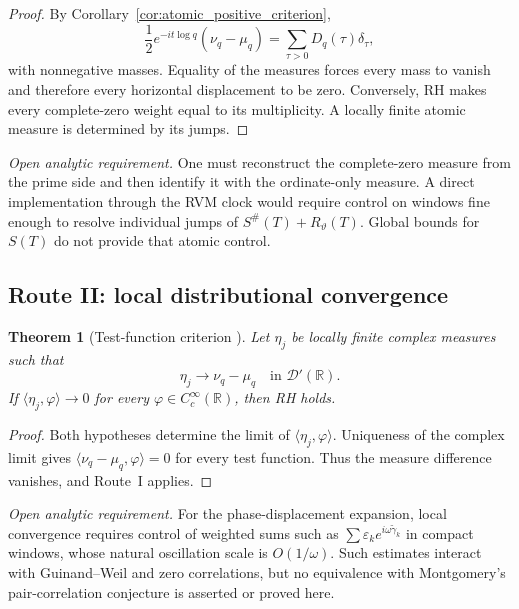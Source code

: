 \documentclass[11pt]{amsart}
\numberwithin{equation}{section}
\theoremstyle{plain}
\newtheorem{theorem}{Theorem}[section]
\theoremstyle{definition}
\theoremstyle{remark}
\newcommand{\1}{\mathbf{1}}
\begin{document}
\begin{proof}
By Corollary~\ref{cor:atomic_positive_criterion},
\begin{equation}
\frac12e^{-it\log q}(\nu_q-\mu_q)
=
\sum_{\tau>0}D_q(\tau)\delta_\tau,
\label{eq:route_atomic_positive_measure}
\end{equation}
with nonnegative masses.  Equality of the measures forces every mass to
vanish and therefore every horizontal displacement to be zero.  Conversely,
RH makes every complete-zero weight equal to its multiplicity.  A locally
finite atomic measure is determined by its jumps.
\end{proof}

\medskip\noindent\emph{Open analytic requirement.} One must reconstruct the complete-zero measure from the prime side
and then identify it with the ordinate-only measure.  A direct implementation
through the RVM clock would require control on windows fine enough to resolve
individual jumps of $S^{\#}(T)+R_\vartheta(T)$.  Global bounds for $S(T)$ do
not provide that atomic control.

\subsection{Route II: local distributional convergence}
\label{subsec:route_distributional}


\begin{theorem}[Test-function criterion {}]
\label{thm:test_function_criterion}
Let $\eta_j$ be locally finite complex measures such that
\begin{equation}
\eta_j\longrightarrow\nu_q-\mu_q
\quad\text{in }\mathcal D'(\mathbb R).
\label{eq:test_measure_identification}
\end{equation}
If $\langle\eta_j,\varphi\rangle\to0$ for every
$\varphi\in C_c^\infty(\mathbb R)$, then RH holds.
\end{theorem}

\begin{proof}
Both hypotheses determine the limit of
$\langle\eta_j,\varphi\rangle$.  Uniqueness of the complex limit gives
$\langle\nu_q-\mu_q,\varphi\rangle=0$ for every test function.  Thus the
measure difference vanishes, and Route~I applies.
\end{proof}

\medskip\noindent\emph{Open analytic requirement.} For the phase-displacement expansion, local convergence requires
control of weighted sums such as
$\sum\varepsilon_k e^{i\omega\widetilde\gamma_k}$ in compact windows,
whose natural oscillation scale is $O(1/\omega)$.  Such estimates interact
with Guinand--Weil and zero correlations, but no equivalence with
Montgomery's pair-correlation conjecture \cite{Montgomery1973} is asserted
or proved here.
\end{document}

